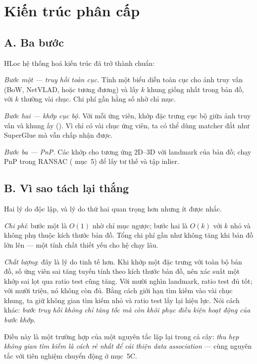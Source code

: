 \documentclass[../../vslam.tex]{subfiles}
\begin{document}
\section{Kiến trúc phân cấp}

\subsection{A. Ba bước}

HLoc \cite{sarlin2019hloc} hệ thống hoá kiến trúc đã trở thành chuẩn:

\emph{Bước một --- truy hồi toàn cục.} Tính một biểu diễn toàn cục cho ảnh truy vấn (BoW, NetVLAD, hoặc tương đương) và lấy \(k\) khung giống nhất trong bản đồ, với \(k\) thường vài chục. Chi phí gần hằng số nhờ chỉ mục.

\emph{Bước hai --- khớp cục bộ.} Với mỗi ứng viên, khớp đặc trưng cục bộ giữa ảnh truy vấn và khung ấy (). Vì chỉ có vài chục ứng viên, ta có thể dùng matcher đắt như SuperGlue mà vẫn chấp nhận được.

\emph{Bước ba --- PnP.} Các khớp cho tương ứng \(2\)D--\(3\)D với landmark của bản đồ; chạy PnP trong RANSAC ( mục~5) để lấy tư thế và tập inlier.

\subsection{B. Vì sao tách lại thắng}

Hai lý do độc lập, và lý do thứ hai quan trọng hơn nhưng ít được nhắc.

\emph{Chi phí}: bước một là \(O(1)\) nhờ chỉ mục ngược; bước hai là \(O(k)\) với \(k\) nhỏ và không phụ thuộc kích thước bản đồ. Tổng chi phí gần như không tăng khi bản đồ lớn lên --- một tính chất thiết yếu cho hệ chạy lâu.

\emph{Chất lượng}: đây là lý do tinh tế hơn. Khi khớp một đặc trưng với toàn bộ bản đồ, số ứng viên sai tăng tuyến tính theo kích thước bản đồ, nên xác suất một khớp sai lọt qua ratio test cũng tăng. Với mười nghìn landmark, ratio test đủ tốt; với mười triệu, nó không còn đủ. Bằng cách giới hạn tìm kiếm vào vài chục khung, ta giữ không gian tìm kiếm nhỏ và ratio test lấy lại hiệu lực. Nói cách khác: \emph{bước truy hồi không chỉ tăng tốc mà còn khôi phục điều kiện hoạt động của bước khớp}.

Điều này là một trường hợp của một nguyên tắc lặp lại trong cả cây: \emph{thu hẹp không gian tìm kiếm là cách rẻ nhất để cải thiện data association} --- cùng nguyên tắc với tiên nghiệm chuyển động ở  mục~5C.
\end{document}
